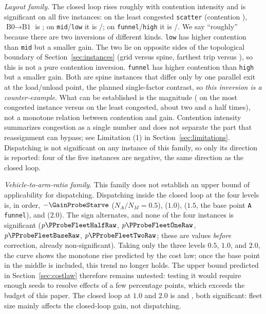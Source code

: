 \emph{Layout family.}
The closed loop rises roughly with contention intensity and is significant on all five instances: on the least congested \texttt{scatter} (contention \ContentionLo{}), $\text{B0}\to\text{B1}$ is \GainLoopScatter{}; on \texttt{mid}/\texttt{low} it is \GainLoopMid{}/\GainLoopLow{}; on \texttt{funnel}/\texttt{high} it is \GainLoopFunnel{}/\GainLoopHigh{}.
We say ``roughly'' because there are two inversions of different kinds.
\texttt{low} has higher contention than \texttt{mid} but a smaller gain. The two lie on opposite sides of the topological boundary of Section~\ref{sec:instances} (grid versus spine, farthest trip \LegGrid{} versus \LegDumbbell{}), so this is not a pure contention inversion.
\texttt{funnel} has higher contention than \texttt{high} but a smaller gain. Both are spine instances that differ only by one parallel exit at the load/unload point, the planned single-factor contrast, so \emph{this inversion is a counter-example}.
What can be established is the magnitude (\GainLoopFunnel{} on the most congested instance versus \GainLoopScatter{} on the least congested, about two and a half times), not a monotone relation between contention and gain.
Contention intensity summarizes congestion as a single number and does not separate the part that reassignment can bypass; see Limitation (1) in Section~\ref{sec:limitations}.
Dispatching is not significant on any instance of this family, so only its direction is reported: four of the five instances are negative, the same direction as the closed loop.

\emph{Vehicle-to-arm-ratio family.}
This family does not establish an upper bound of applicability for dispatching. Dispatching inside the closed loop at the four levels is, in order, $-\GainProbeStarve$ ($N_A/N_M=0.5$), \GainProbeFleetOne{} ($1.0$), \GainProbeFleetBase{} ($1.5$, the base point \texttt{A funnel}), and \GainProbeFleetTwo{} ($2.0$). The sign alternates, and none of the four instances is significant ($p\PProbeFleetHalfRaw$, $p\PProbeFleetOneRaw$, $p\PProbeFleetBaseRaw$, $p\PProbeFleetTwoRaw$; these are values \emph{before} correction, already non-significant).
Taking only the three levels $0.5$, $1.0$, and $2.0$, the curve shows the monotone rise predicted by the cost law; once the base point in the middle is included, this trend no longer holds.
The upper bound predicted in Section~\ref{sec:costlaw} therefore remains untested: testing it would require enough seeds to resolve effects of a few percentage points, which exceeds the budget of this paper.
The closed loop at $1.0$ and $2.0$ is \GainLoopFleetOne{} and \GainLoopFleetTwo{}, both significant: fleet size mainly affects the closed-loop gain, not dispatching.

